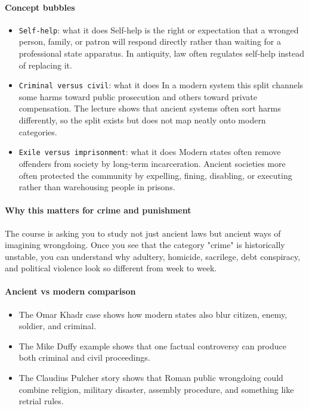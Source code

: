 \documentclass[11pt]{article}
\begin{document}
\paragraph{Concept bubbles}

\begin{itemize}
\item \texttt{Self-help}: what it does Self-help is the right or expectation that a wronged person, family, or patron will respond directly rather than waiting for a professional state apparatus. In antiquity, law often regulates self-help instead of replacing it.
\item \texttt{Criminal versus civil}: what it does In a modern system this split channels some harms toward public prosecution and others toward private compensation. The lecture shows that ancient systems often sort harms differently, so the split exists but does not map neatly onto modern categories.
\item \texttt{Exile versus imprisonment}: what it does Modern states often remove offenders from society by long-term incarceration. Ancient societies more often protected the community by expelling, fining, disabling, or executing rather than warehousing people in prisons.
\end{itemize}

\paragraph{Why this matters for crime and punishment}

The course is asking you to study not just ancient laws but ancient ways of imagining wrongdoing. Once you see that the category "crime" is historically unstable, you can understand why adultery, homicide, sacrilege, debt conspiracy, and political violence look so different from week to week.

\paragraph{Ancient vs modern comparison}

\begin{itemize}
\item The Omar Khadr case shows how modern states also blur citizen, enemy, soldier, and criminal.
\item The Mike Duffy example shows that one factual controversy can produce both criminal and civil proceedings.
\item The Claudius Pulcher story shows that Roman public wrongdoing could combine religion, military disaster, assembly procedure, and something like retrial rules.
\end{itemize}
\end{document}
